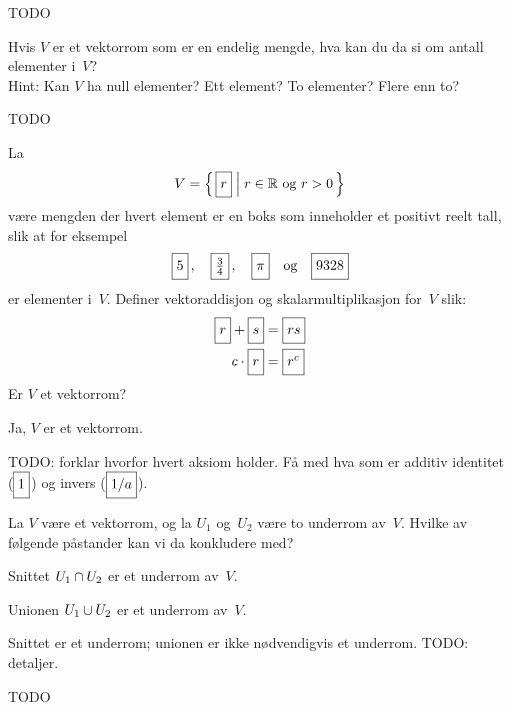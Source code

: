 \begin{losning}
TODO
\end{losning}


\begin{oppgave}
Hvis $V$ er et vektorrom som er en endelig mengde, hva kan du da si om
antall elementer i~$V$?
\\
Hint: Kan $V$ ha null elementer?  Ett element?  To elementer?  Flere
enn to?
\end{oppgave}

\begin{losning}
TODO
\end{losning}


\begin{oppgave}
La
\[
V = \left\{\, \boks{r} \;\middle|\; \text{$r \in \R$ og $r > 0$} \,\right\}
\]
være mengden der hvert element er en boks som inneholder et positivt reelt tall,
slik at for eksempel
\[
\boks{5}\,,\quad
\boks{\frac{3}{4}}\,,\quad
\boks{\pi}\quad\text{og}\quad
\boks{9328}
\]
er elementer i~$V$.  Definer vektoraddisjon og skalarmultiplikasjon
for~$V$ slik:
\begin{align*}
\boks{r} + \boks{s} &= \boks{rs} \\
c \cdot \boks{r}    &= \boks{r^c}
\end{align*}
Er $V$ et vektorrom?
\end{oppgave}

\begin{losning}
Ja, $V$ er et vektorrom.

TODO: forklar hvorfor hvert aksiom holder.  Få med hva som er additiv
identitet ($\boks{1}$) og invers ($\boks{1/a}$).
\end{losning}


\begin{oppgave}
La $V$ være et vektorrom, og la $U_1$ og~$U_2$ være to underrom
av~$V$.  Hvilke av følgende påstander kan vi da konkludere med?
\begin{punkt}
Snittet $U_1 \cap U_2$ er et underrom av~$V$.
\end{punkt}
\begin{punkt}
Unionen $U_1 \cup U_2$ er et underrom av~$V$.
\end{punkt}
\end{oppgave}

\begin{losning}
Snittet er et underrom; unionen er ikke nødvendigvis et underrom.
TODO: detaljer.
\end{losning}


\begin{oppgave}
\end{oppgave}

\begin{losning}
TODO
\end{losning}


